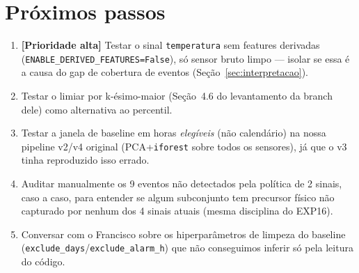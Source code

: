 \documentclass[11pt,a4paper]{article}
\begin{document}
\section{Próximos passos}

\begin{enumerate}[leftmargin=1.6em]
  \item \textbf{[Prioridade alta]} Testar o sinal \texttt{temperatura}
  sem features derivadas (\texttt{ENABLE\_DERIVED\_FEATURES=False}), só
  sensor bruto limpo --- isolar se essa é a causa do gap de cobertura de
  eventos (Seção~\ref{sec:interpretacao}).
  \item Testar o limiar por k-ésimo-maior (Seção~4.6 do levantamento da
  branch dele) como alternativa ao percentil.
  \item Testar a janela de baseline em horas \emph{elegíveis} (não
  calendário) na nossa pipeline v2/v4 original (PCA+\texttt{iforest}
  sobre todos os sensores), já que o v3 tinha reproduzido isso errado.
  \item Auditar manualmente os 9 eventos não detectados pela política de
  2 sinais, caso a caso, para entender se algum subconjunto tem
  precursor físico não capturado por nenhum dos 4 sinais atuais (mesma
  disciplina do EXP16).
  \item Conversar com o Francisco sobre os hiperparâmetros de limpeza do
  baseline (\texttt{exclude\_days}/\texttt{exclude\_alarm\_h}) que não
  conseguimos inferir só pela leitura do código.
\end{enumerate}
\end{document}
